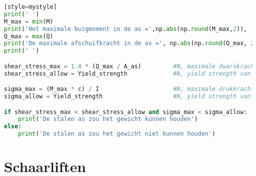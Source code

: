 \begin{lstlisting}[language=Python][style=mystyle]
print(' ')
M_max = min(M)    
print('Het maximale buigmoment in de as =',np.abs(np.round(M_max,2)), 'N/m')  
Q_max = max(Q)
print('De maximale afschuifkracht in de as =', np.abs(np.round(Q_max, 2)), 'N')
print(' ')

shear_stress_max = 1.4 * (Q_max / A_as)         #N, maximale dwarskracht die op as wordt uitgeoefend
shear_stress_allow = Yield_strength             #N, yield strength van staal A36

sigma_max = (M_max * c) / I                     #N, maximale drukkracht die op de as wordt uitgeoefend
sigma_allow = Yield_strength                    #N, yield strength van staal A36

if shear_stress_max < shear_stress_allow and sigma_max < sigma_allow:
    print('De stalen as zou het gewicht kunnen houden')
else:
    print('De stalen as zou het gewicht niet kunnen houden')

\end{lstlisting}

\section{Schaarliften}
\label{se: bijlage_F schaarliften}
\vspace{\baselineskip}


